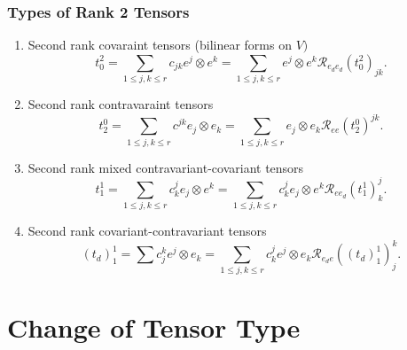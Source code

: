 \documentclass[aps,preprint]{revtex4}
\begin{document}
\subsubsection{Types of Rank 2 Tensors \label{Types of Rank 2 Tensors}}

\begin{enumerate}
\item Second rank covaraint tensors (bilinear forms on $V)$ \label{Second
rank covaraint tensors (bilinear forms on V)} 
\begin{equation}
t_{0}^{2}=\sum_{1\leq j,k\leq r}c_{jk}e^{j}\otimes e^{k}=\sum_{1\leq j,k\leq
r}e^{j}\otimes e^{k}\mathcal{R}_{e_{d}e_{d}}\left( t_{0}^{2}\right) _{jk}.
\end{equation}

\item Second rank contravaraint tensors \label{Second rank contravaraint
tensors} 
\begin{equation}
t_{2}^{0}=\sum_{1\leq j,k\leq r}c^{jk}e_{j}\otimes e_{k}=\sum_{1\leq j,k\leq
r}e_{j}\otimes e_{k}\mathcal{R}_{ee}\left( t_{2}^{0}\right) ^{jk}.
\end{equation}

\item Second rank mixed contravariant-covariant tensors \label{Second rank
mixed contravariant-covariant tensors} 
\begin{equation*}
t_{1}^{1}=\sum_{1\leq j,k\leq r}c_{k}^{j}e_{j}\otimes e^{k}=\sum_{1\leq
j,k\leq r}c_{k}^{j}e_{j}\otimes e^{k}\mathcal{R}_{ee_{d}}\left(
t_{1}^{1}\right) _{k}^{j}.
\end{equation*}

\item Second rank covariant-contravariant tensors \label{Second rank
covariant-contravariant tensors} 
\begin{equation}
\left( t_{d}\right) _{1}^{1}=\sum c_{j}^{k}e^{j}\otimes e_{k}=\sum_{1\leq
j,k\leq r}c_{k}^{j}e^{j}\otimes e_{k}\mathcal{R}_{e_{d}e}\left( \left(
t_{d}\right) _{1}^{1}\right) _{j}^{k}.
\end{equation}
\end{enumerate}

\section{Change of Tensor Type}
\end{document}
